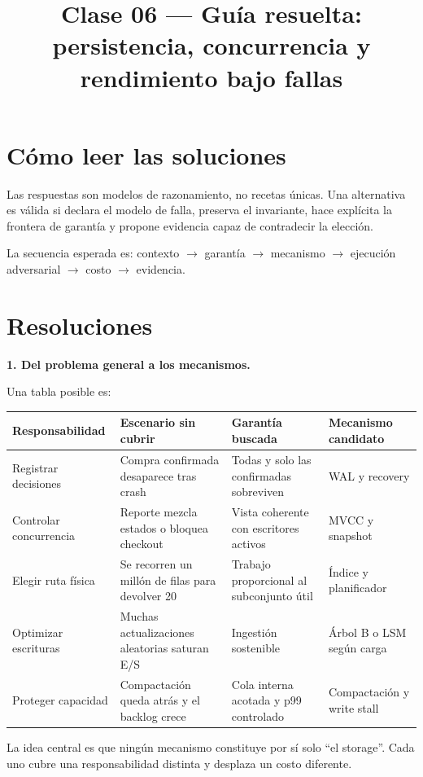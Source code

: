 \documentclass[variant=guiaresuelta,cover=institutional,mode=screen]{ua-engineering-v6-article}
\title{Clase 06 --- Guía resuelta: persistencia, concurrencia y rendimiento bajo fallas}
\author{\UAProfessor}
\date{\UADate}
\begin{document}
\setlength{\emergencystretch}{2em}
\maketitle

\section{Cómo leer las soluciones}

Las respuestas son modelos de razonamiento, no recetas únicas. Una alternativa es válida si declara el modelo de falla, preserva el invariante, hace explícita la frontera de garantía y propone evidencia capaz de contradecir la elección.

\begin{uakeybox}
La secuencia esperada es: contexto $\rightarrow$ garantía $\rightarrow$ mecanismo $\rightarrow$ ejecución adversarial $\rightarrow$ costo $\rightarrow$ evidencia.
\end{uakeybox}

\section{Resoluciones}

\begin{uaexercise}
\textbf{1. Del problema general a los mecanismos.}
\end{uaexercise}
\begin{uaanswer}
Una tabla posible es:

\begin{center}
\small
\begin{tabular}{p{}p{}p{}p{}}
\toprule
Responsabilidad & Escenario sin cubrir & Garantía buscada & Mecanismo candidato \\
\midrule
Registrar decisiones & Compra confirmada desaparece tras crash & Todas y solo las confirmadas sobreviven & WAL y recovery \\
Controlar concurrencia & Reporte mezcla estados o bloquea checkout & Vista coherente con escritores activos & MVCC y snapshot \\
Elegir ruta física & Se recorren un millón de filas para devolver 20 & Trabajo proporcional al subconjunto útil & Índice y planificador \\
Optimizar escrituras & Muchas actualizaciones aleatorias saturan E/S & Ingestión sostenible & Árbol B o LSM según carga \\
Proteger capacidad & Compactación queda atrás y el backlog crece & Cola interna acotada y p99 controlado & Compactación y write stall \\
\bottomrule
\end{tabular}
\end{center}

La idea central es que ningún mecanismo constituye por sí solo ``el storage''. Cada uno cubre una responsabilidad distinta y desplaza un costo diferente.
\end{uaanswer}
\end{document}

